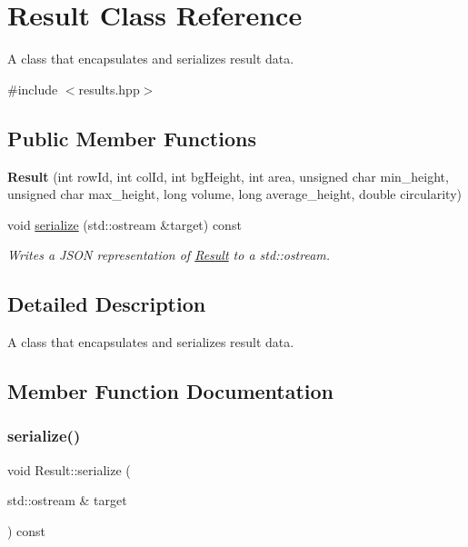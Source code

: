 \hypertarget{class_result}{}\section{Result Class Reference}
\label{class_result}


A class that encapsulates and serializes result data.  




{\ttfamily \#include $<$results.\+hpp$>$}

\subsection*{Public Member Functions}
\begin{DoxyCompactItemize}
\item 
\mbox{\label{class_result_acc26931e2c32fddb02413449b7f03278}} 
{\bfseries Result} (int row\+Id, int col\+Id, int bg\+Height, int area, unsigned char min\+\_\+height, unsigned char max\+\_\+height, long volume, long average\+\_\+height, double circularity)
\item 
void \hyperlink{class_result_a60cc412b37005131a08b776e63755ded}{serialize} (std\+::ostream \&target) const
\begin{DoxyCompactList}\small\item\em Writes a J\+S\+ON representation of \hyperlink{class_result}{Result} to a std\+::ostream. \end{DoxyCompactList}\end{DoxyCompactItemize}


\subsection{Detailed Description}
A class that encapsulates and serializes result data. 

\subsection{Member Function Documentation}
\mbox{\label{class_result_a60cc412b37005131a08b776e63755ded}} 
\subsubsection{\texorpdfstring{serialize()}{serialize()}}
{\footnotesize\ttfamily void Result\+::serialize (\begin{DoxyParamCaption}\item[{std\+::ostream \&}]{target }\end{DoxyParamCaption}) const}




